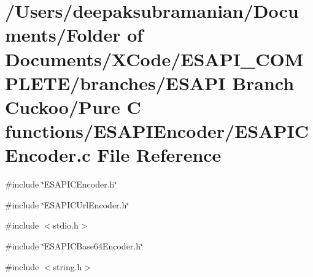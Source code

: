 \hypertarget{a00022}{
\section{/Users/deepaksubramanian/Documents/Folder of Documents/XCode/ESAPI\_\-COMPLETE/branches/ESAPI Branch Cuckoo/Pure C functions/ESAPIEncoder/ESAPICEncoder.c File Reference}
\label{d7/de0/a00022}
}
{\ttfamily \#include \char`\"{}ESAPICEncoder.h\char`\"{}}\par
{\ttfamily \#include \char`\"{}ESAPICUrlEncoder.h\char`\"{}}\par
{\ttfamily \#include $<$stdio.h$>$}\par
{\ttfamily \#include \char`\"{}ESAPICBase64Encoder.h\char`\"{}}\par
{\ttfamily \#include $<$string.h$>$}\par
